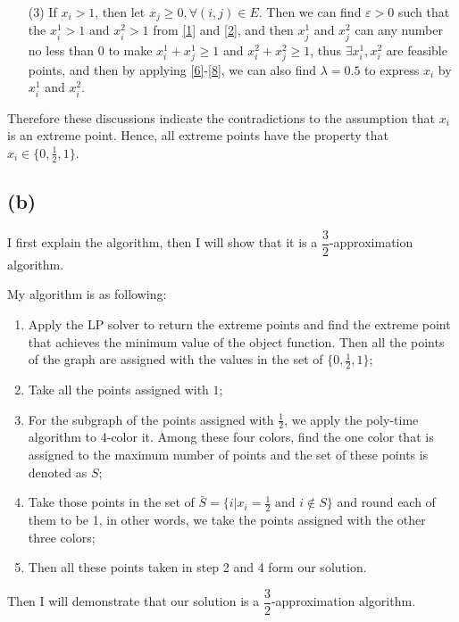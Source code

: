 \documentclass[a4paper,12pt]{article}
\begin{document}
\begin{enumerate}
\item[(3) ] If $x_i > 1$, then let $x_j \geq 0, \forall (i,j) \in E$. Then we can find $\varepsilon >0$ such that the $x_i^1 > 1$ and $x_i^2 > 1$ from \eqref{1} and  \eqref{2}, and then $x_j^1$ and $x_j^2$ can any number no less than 0 to make $x_i^1 + x_j^1 \geq 1$ and $x_i^2 + x_j^2 \geq 1$, thus $\exists x_i^1, x_i^2$ are feasible points, and then by applying \eqref{6}-\eqref{8}, we can also find $\lambda=0.5$ to express $x_i$ by $x_i^1$ and $x_i^2$. 
\end{enumerate}
Therefore these discussions indicate the contradictions to the assumption that $x_i$ is an extreme point. Hence, all extreme points have the property that $x_i  \in \{0, \frac{1}{2}, 1\}$.

\subsection*{(b)}
I first explain the algorithm, then I will show that it is a $\dfrac{3}{2}$-approximation algorithm.

My algorithm is as following:
\begin{enumerate}
\item Apply the LP solver to return the extreme points and find the extreme point that achieves the minimum value of the object function. Then all the points of the graph are assigned with the values in the set of $  \{0,\frac{1}{2}, 1\}$;
\item Take all the points assigned  with $1$;
\item For the subgraph of the points assigned with $\frac{1}{2}$, we apply the poly-time algorithm to 4-color it. Among these four colors, find the one color that is assigned to the maximum number of points and the set of these points is denoted as $S$;
\item Take those points in the set of $\bar{S}=\{i| x_i=\frac{1}{2} \text{ and }i \notin S\}$ and round each of them to be 1, in other words, we take the points assigned with the other three colors;
\item Then all these points taken in step 2 and 4 form our solution. 
\end{enumerate}

Then I will demonstrate that our solution is a $\dfrac{3}{2}$-approximation algorithm.
\end{document}
